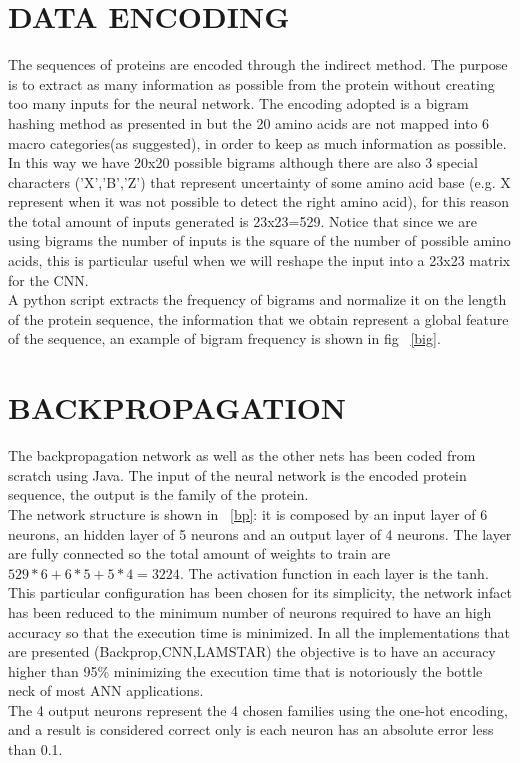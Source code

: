 \documentclass[a4paper, 10pt, conference]{ieeeconf}      %
\begin{document}
\section{DATA ENCODING}\label{sec:encoding}
	The sequences of proteins are encoded through the indirect method. The purpose is to extract as many information as possible from the protein without creating too many inputs for the neural network. The encoding adopted is a bigram hashing method as presented in \cite{bookWu} but the 20 amino acids are not mapped into 6 macro categories(as suggested), in order to keep as much information as possible. In this way we have 20x20 possible bigrams although there are also 3 special characters ('X','B','Z') that represent uncertainty of some amino acid base (e.g. X represent when it was not possible to detect the right amino acid), for this reason the total amount of inputs generated is 23x23=529. Notice that since we are using bigrams the number of inputs is the square of the number of possible amino acids, this is particular useful when we will reshape the input into a 23x23 matrix for the CNN.\\ A python script extracts the frequency of bigrams and normalize it on the length of the protein sequence, the information that we obtain represent a global feature of the sequence, an example of bigram frequency is shown in fig ~\ref{big}.



\clearpage
\newpage

\section{BACKPROPAGATION}\label{sec:bp}

	The backpropagation network as well as the other nets has been coded from scratch using Java.
	The input of the neural network is the encoded protein sequence, the output is the family of the protein.\\
	The network structure is shown in ~\ref{bp}: it is composed by an input layer of 6 neurons, an hidden layer of 5 neurons and an output layer of 4 neurons. The layer are fully connected so the total amount of weights to train are $529*6 + 6*5 + 5*4=3224$. The activation function in each layer is the tanh.\\ This particular configuration has been chosen for its simplicity, the network infact has been reduced to the minimum number of neurons required to have an high accuracy so that the execution time is minimized. In all the implementations that are presented (Backprop,CNN,LAMSTAR) the objective is to have an accuracy higher than 95\% minimizing the execution time that is notoriously the bottle neck of most ANN applications.\\
	The 4 output neurons represent the 4 chosen families using the one-hot encoding, and a result is considered correct only is each neuron has an absolute error less than 0.1.\\
\end{document}
